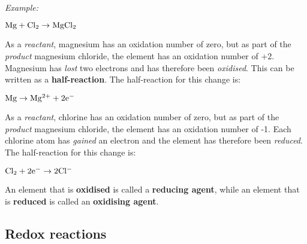 

\textit{Example:}


\begin{center}
$\rm{Mg + Cl_{2} \rightarrow MgCl_{2}}$
\end{center}

As a \textit{reactant}, magnesium has an oxidation number of zero, but as part of the \textit{product} magnesium chloride, the element has an oxidation number of +2. Magnesium has \textit{lost} two electrons and has therefore been \textit{oxidised}. This can be written as a \textbf{half-reaction}. The half-reaction for this change is:

\begin{center}
$\rm{Mg \rightarrow Mg^{2+} + 2e^{-}}$
\end{center}

As a \textit{reactant}, chlorine has an oxidation number of zero, but as part of the \textit{product} magnesium chloride, the element has an oxidation number of -1. Each chlorine atom has \textit{gained} an electron and the element has therefore been \textit{reduced}. The half-reaction for this change is:

\begin{center}
$\rm{Cl_{2} + 2e^{-} \rightarrow 2Cl^{-}}$
\end{center}



An element that is \textbf{oxidised} is called a \textbf{reducing agent}, while an element that is \textbf{reduced} is called an \textbf{oxidising agent}.

\subsection{Redox reactions}


